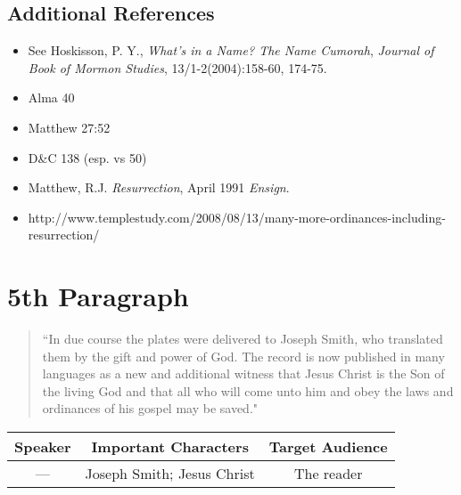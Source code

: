 \documentclass[12pt]{report}
\begin{document}
\subsection{Additional References\label{intro:references4}}
\begin{itemize}
\item See Hoskisson, P. Y., \emph{What's in a Name? The Name \emph{Cumorah}}, \emph{Journal of Book of Mormon Studies}, 13/1-2(2004):158-60, 174-75.
\item Alma 40
\item Matthew 27:52
\item D\&C 138 (esp. vs 50)
\item Matthew, R.J. \emph{Resurrection}, April 1991 \emph{Ensign}.
\item http://www.templestudy.com/2008/08/13/many-more-ordinances-including-resurrection/
\end{itemize}

\section{5th Paragraph\label{intro:5th}}
\begin{center}
\begin{quote}
``In due course the plates were delivered to Joseph Smith, who translated them by the gift and power of God.  The record is now published in many languages as a new and additional witness that Jesus Christ is the Son of the living God and that all who will come unto him and obey the laws and ordinances of his gospel may be saved."
\end{quote}
\end{center}

\begin{table}[h!]
\centering
\label{table:intro5}
\begin{tabular*}{\textwidth}{c @{\extracolsep{\fill}}cc}
Speaker & Important Characters & Target Audience \\
\hline
\rule{0pt}{3ex}--- & Joseph Smith; Jesus Christ & The reader 
\end{tabular*}
\end{table}
\end{document}
